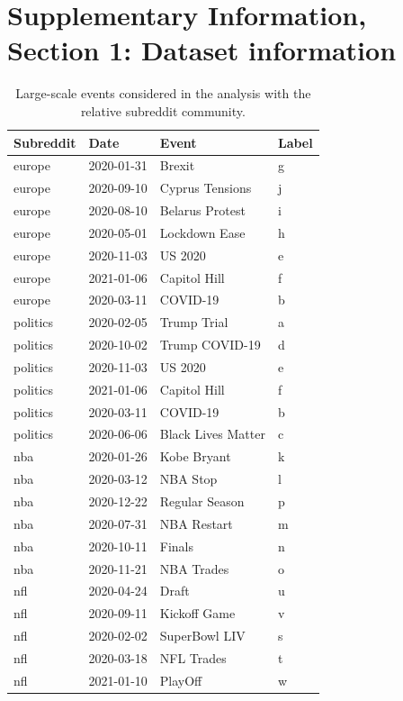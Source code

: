 \documentclass[fleqn,10pt]{wlscirep}
\begin{document}
\section*{Supplementary Information, Section 1: Dataset information}\label{sm_dataset_info}
%
\begin{table}[h!]
    \caption{Large-scale events considered in the analysis with the relative subreddit community.\label{tab_sm_data_events}}%
	\begin{tabular*}{\columnwidth}{@{\extracolsep\fill}llll@{\extracolsep\fill}}
    \toprule
    {\textbf{Subreddit}} & {\textbf{Date}} & {\textbf{Event}} & {\textbf{Label}}\\
    \midrule
       europe & 2020-01-31 &               Brexit & g\\
       europe & 2020-09-10 &     Cyprus Tensions & j \\
       europe & 2020-08-10 &     Belarus Protest & i \\
       europe & 2020-05-01 &       Lockdown Ease & h \\
       europe & 2020-11-03 &              US 2020 & e \\
       europe & 2021-01-06 &        Capitol Hill & f \\
       europe & 2020-03-11 &             COVID-19 & b \\
     politics & 2020-02-05 &         Trump Trial & a\\
     politics & 2020-10-02 &      Trump COVID-19 & d\\
     politics & 2020-11-03 &              US 2020 & e \\
     politics & 2021-01-06 &        Capitol Hill & f \\
     politics & 2020-03-11 &             COVID-19 & b \\
     politics & 2020-06-06 & Black Lives Matter & c\\
          nba & 2020-01-26 &         Kobe Bryant & k \\
          nba & 2020-03-12 &            NBA Stop & l \\
          nba & 2020-12-22 &      Regular Season & p \\
          nba & 2020-07-31 &         NBA Restart & m \\
          nba & 2020-10-11 &               Finals & n \\
          nba & 2020-11-21 &          NBA Trades  & o \\
          nfl & 2020-04-24 &                Draft & u \\
          nfl & 2020-09-11 &        Kickoff Game  & v \\
          nfl & 2020-02-02 &       SuperBowl LIV & s \\
          nfl & 2020-03-18 &          NFL Trades & t \\
          nfl & 2021-01-10 &              PlayOff & w  \\
    \bottomrule
	\end{tabular*}
\end{table}
\end{document}
